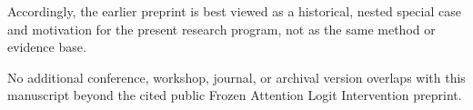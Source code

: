 \documentclass[10pt]{article}
\begin{document}
Accordingly, the earlier preprint is best viewed as a historical, nested special case and motivation for the present research program, not as the same method or evidence base.

No additional conference, workshop, journal, or archival version overlaps with this manuscript beyond the cited public Frozen Attention Logit Intervention preprint.
\end{document}
